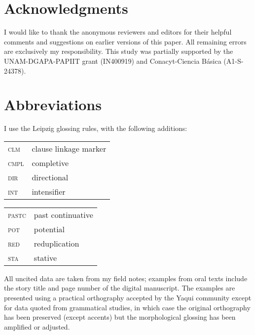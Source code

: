 \documentclass[output=paper]{langscibook}
\begin{document}
\section*{Acknowledgments}



I would like to thank the anonymous reviewers and editors for their helpful comments and suggestions on earlier versions of this paper. All remaining errors are exclusively my responsibility. This study was partially supported by the UNAM-DGAPA-PAPIIT grant (IN400919) and Conacyt-Ciencia Básica (A1-S-24378).



\section*{Abbreviations}

I use the Leipzig glossing rules, with the following additions:\\


\begin{tabularx}{.45\textwidth}{>{\scshape}lQ}
clm& clause linkage marker\\
cmpl& completive\\
dir& directional\\
int& intensifier\\
\end{tabularx}
\begin{tabularx}{.45\textwidth}{>{\scshape}lQ}
pastc& past continuative\\
pot& potential\\
red& reduplication\\
sta& stative
\end{tabularx}\medskip

All uncited data are taken from my field notes; examples from oral texts include the story title and page number of the digital manuscript. The examples are presented using a practical orthography accepted by the Yaqui community except for data quoted from grammatical studies, in which case the original orthography has been preserved (except accents) but the morphological glossing has been amplified or adjusted.













{\sloppy\printbibliography[heading=subbibliography,notkeyword=this]}
\end{document}
